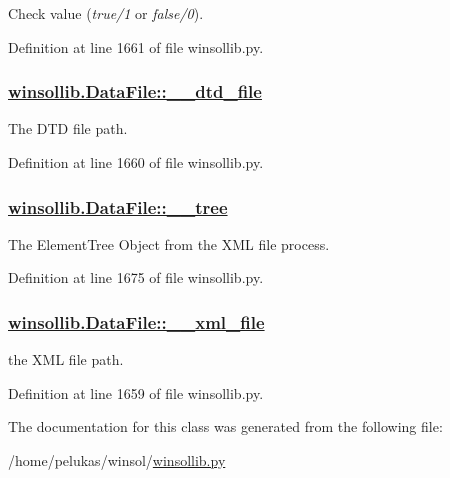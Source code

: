 Check value ({\em true/1\/} or {\em false/0\/}). 



Definition at line 1661 of file winsollib.py.\hypertarget{classwinsollib_1_1DataFile_385b781cf5c921e4f027140999ee1333}{
\subsubsection[\_\-\_\-dtd\_\-file]{\setlength{\rightskip}{0pt plus 5cm}\hyperlink{classwinsollib_1_1DataFile_385b781cf5c921e4f027140999ee1333}{winsollib.Data\-File::\_\-\_\-dtd\_\-file}}}
\label{classwinsollib_1_1DataFile_385b781cf5c921e4f027140999ee1333}


The DTD file path. 



Definition at line 1660 of file winsollib.py.\hypertarget{classwinsollib_1_1DataFile_37505659823960cd319e51a2ce74c56f}{
\subsubsection[\_\-\_\-tree]{\setlength{\rightskip}{0pt plus 5cm}\hyperlink{classwinsollib_1_1DataFile_37505659823960cd319e51a2ce74c56f}{winsollib.Data\-File::\_\-\_\-tree}}}
\label{classwinsollib_1_1DataFile_37505659823960cd319e51a2ce74c56f}


The Element\-Tree Object from the XML file process. 



Definition at line 1675 of file winsollib.py.\hypertarget{classwinsollib_1_1DataFile_8f0afc91519f74a1b6c48d35c6de2c27}{
\subsubsection[\_\-\_\-xml\_\-file]{\setlength{\rightskip}{0pt plus 5cm}\hyperlink{classwinsollib_1_1DataFile_8f0afc91519f74a1b6c48d35c6de2c27}{winsollib.Data\-File::\_\-\_\-xml\_\-file}}}
\label{classwinsollib_1_1DataFile_8f0afc91519f74a1b6c48d35c6de2c27}


the XML file path. 



Definition at line 1659 of file winsollib.py.

The documentation for this class was generated from the following file:\begin{CompactItemize}
\item 
/home/pelukas/winsol/\hyperlink{winsollib_8py}{winsollib.py}\end{CompactItemize}
